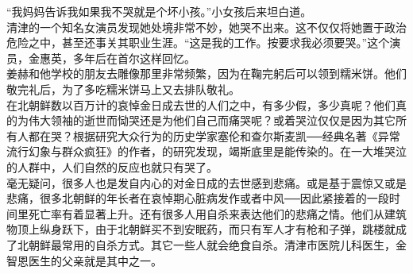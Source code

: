 “我妈妈告诉我如果我不哭就是个坏小孩。”小女孩后来坦白道。\\

清津的一个知名女演员发现她处境非常不妙，她哭不出来。这不仅仅将她置于政治危险之中，甚至还事关其职业生涯。“这是我的工作。按要求我必须要哭。”这个演员，金惠英，多年后在首尔这样回忆。\\

姜赫和他学校的朋友去雕像那里非常频繁，因为在鞠完躬后可以领到糯米饼。他们敬完礼后，为了多吃糯米饼马上又去排队敬礼。\\

在北朝鲜数以百万计的哀悼金日成去世的人们之中，有多少假，多少真呢？他们真的为伟大领袖的逝世而恸哭还是为他们自己而痛哭呢？或着哭泣仅仅是因为其它所有人都在哭？根据研究大众行为的历史学家塞伦和查尔斯麦凯──经典名著《异常流行幻象与群众疯狂》的作者，的研究发现，竭斯底里是能传染的。在一大堆哭泣的人群中，人们自然的反应也就只有哭了。\\

毫无疑问，很多人也是发自内心的对金日成的去世感到悲痛。或是基于震惊又或是悲痛，很多北朝鲜的年长者在哀悼期心脏病发作或者中风──因此紧接着的一段时间里死亡率有着显著上升。还有很多人用自杀来表达他们的悲痛之情。他们从建筑物顶上纵身跃下，由于北朝鲜买不到安眠药，而只有军人才有枪和子弹，跳楼就成了北朝鲜最常用的自杀方式。其它一些人就会绝食自杀。清津市医院儿科医生，金智恩医生的父亲就是其中之一。\\
